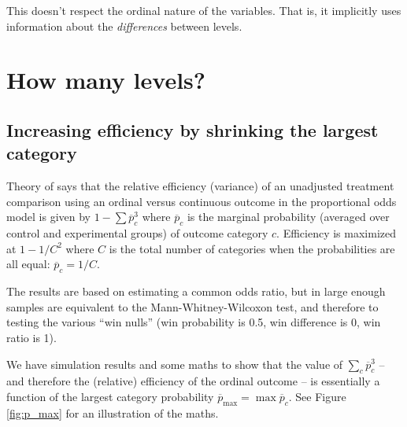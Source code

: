 \documentclass[
  11pt,
  fleqn
]{article}
\begin{document}
This doesn't respect the ordinal nature of the variables. That is, it
implicitly uses information about the \emph{differences} between levels.

\section{How many levels?}

\subsection{Increasing efficiency by shrinking the largest category}

Theory of \citep{whiteheadSampleSizeCalculations1993} says that the relative
efficiency (variance) of an unadjusted treatment comparison using an ordinal
versus continuous outcome in the proportional odds model is given
by $1 - \sum
\overline p_c^3$ where $\overline p_c$ is the marginal probability (averaged
over control and experimental groups) of outcome category $c$.
Efficiency is maximized at $1 - 1/C^2$ where $C$ is the total number of
categories when the probabilities are all equal: $\overline p_c = 1/C$.

The results are based on estimating a common odds ratio, but in large
enough samples are equivalent to the Mann-Whitney-Wilcoxon test, and
therefore to testing the various ``win nulls'' (win probability is
  0.5, win difference
is 0, win ratio is 1).

We have simulation results and some maths to show that the value of $\sum_c
\overline p_c^3$ -- and therefore the (relative) efficiency of the
ordinal outcome -- is essentially a function of the largest category
probability $\overline{p}_{\max} = \max \overline{p}_c$. See Figure
\ref{fig:p_max} for an illustration of the maths.
\end{document}
